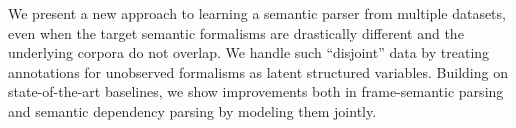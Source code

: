 We present a new approach to learning a semantic parser from multiple datasets, even when the target semantic formalisms are drastically different and the underlying corpora do not overlap. We handle such ``disjoint'' data by treating annotations for unobserved formalisms as latent structured variables. Building on state-of-the-art baselines, we show improvements both in frame-semantic parsing and semantic dependency parsing by modeling them jointly.
